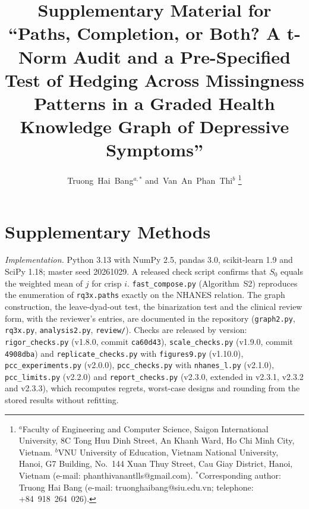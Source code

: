 \documentclass[journal]{IEEEtran}
\begin{document}
\title{Supplementary Material for ``Paths, Completion, or Both? A t-Norm Audit and a Pre-Specified Test of Hedging Across Missingness Patterns in a Graded Health Knowledge Graph of Depressive Symptoms''}
\author{Truong~Hai~Bang$^{a,*}$ and~Van~An~Phan~Thi$^{b}$%
\thanks{$^{a}$Faculty of Engineering and Computer Science, Saigon International University, 8C Tong Huu Dinh Street, An Khanh Ward, Ho Chi Minh City, Vietnam. $^{b}$VNU University of Education, Vietnam National University, Hanoi, G7 Building, No.~144 Xuan Thuy Street, Cau Giay District, Hanoi, Vietnam (e-mail: phanthivanantlls@gmail.com). $^{*}$Corresponding author: Truong Hai Bang (e-mail: truonghaibang@siu.edu.vn; telephone: +84~918~264~026).}}
\maketitle

\section*{Supplementary Methods}

\emph{Implementation.} Python 3.13 with NumPy 2.5, pandas 3.0, scikit-learn 1.9 and SciPy 1.18; master seed 20261029. A released check script confirms that $S_0$ equals the weighted mean of $j$ for crisp $i$. \texttt{fast\_compose.py} (Algorithm~S2) reproduces the enumeration of \texttt{rq3x.paths} exactly on the NHANES relation. The graph construction, the leave-dyad-out test, the binarization test and the clinical review form, with the reviewer's entries, are documented in the repository (\texttt{graph2.py}, \texttt{rq3x.py}, \texttt{analysis2.py}, \texttt{review/}). Checks are released by version: \texttt{rigor\_checks.py} (v1.8.0, commit \texttt{ca60d43}), \texttt{scale\_checks.py} (v1.9.0, commit \texttt{4908dba}) and \texttt{replicate\_checks.py} with \texttt{figures9.py} (v1.10.0), \texttt{pcc\_experiments.py} (v2.0.0), \texttt{pcc\_checks.py} with \texttt{nhanes\_l.py} (v2.1.0), \texttt{pcc\_limits.py} (v2.2.0) and \texttt{report\_checks.py} (v2.3.0, extended in v2.3.1, v2.3.2 and v2.3.3), which recomputes regrets, worst-case designs and rounding from the stored results without refitting.
\end{document}
